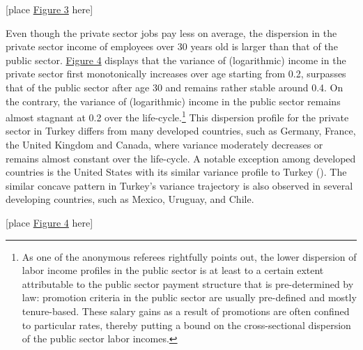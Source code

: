 \documentclass[12pt,author-year]{article}
\begin{document}
\begin{center}
	[place \hyperref[figure3]{Figure 3} here]
\end{center}

Even though the private sector jobs pay less on average, the dispersion in the private sector income of employees over 30 years old is larger than that of the public sector. \hyperref[figure4]{Figure 4} displays that the variance of (logarithmic) income in the private sector first monotonically increases over age starting from 0.2, surpasses that of the public sector after age 30 and remains rather stable around 0.4. On the contrary, the variance of (logarithmic) income in the public sector remains almost stagnant at 0.2 over the life-cycle.\footnote{As one of the anonymous referees rightfully points out, the lower dispersion of labor income profiles in the public sector is at least to a certain extent attributable to the public sector payment structure that is pre-determined by law: promotion criteria in the public sector are usually pre-defined and mostly tenure-based. These salary gains as a result of promotions are often confined to particular rates, thereby putting a bound on the cross-sectional dispersion of the public sector labor incomes.} This dispersion profile for the private sector in Turkey differs from many developed countries, such as Germany, France, the United Kingdom and Canada, where variance moderately decreases or remains almost constant over the life-cycle. A notable exception among developed countries is the United States with its similar variance profile to Turkey (\citealp{Lagakos}). The similar concave pattern in Turkey's variance trajectory is also observed in several developing countries, such as Mexico, Uruguay, and Chile.


\begin{center}
	[place \hyperref[figure4]{Figure 4} here]
\end{center}
\end{document}
